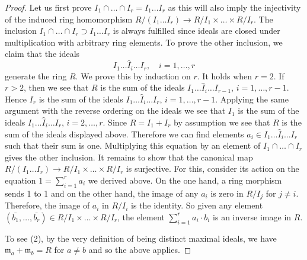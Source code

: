\documentclass[10pt,a4paper]{amsart}
\theoremstyle{plain}
\theoremstyle{definition}
\theoremstyle{remark}
\numberwithin{equation}{subsection}
\begin{document}
\begin{proof}
Let us first prove $I_1 \cap \ldots \cap I_r = I_1 \ldots I_r$
as this will also imply the injectivity of the induced ring
homomorphism $R/(I_1 \ldots I_r) \rightarrow R/I_1 \times \ldots \times R/I_r$.
The inclusion $I_1 \cap \ldots \cap I_r \supset I_1 \ldots I_r$ is always
fulfilled since ideals are closed under multiplication with arbitrary ring
elements. To prove the other inclusion, we claim that the ideals
$$
I_1 \ldots \hat I_i \ldots I_r,\quad i = 1, \ldots, r
$$
generate the ring $R$. We prove this by induction on $r$. It holds when
$r = 2$. If $r > 2$, then we see that $R$ is the sum of the ideals
$I_1 \ldots \hat I_i \ldots I_{r - 1}$, $i = 1, \ldots, r - 1$.
Hence $I_r$ is the sum of the ideals
$I_1 \ldots \hat I_i \ldots I_r$, $i = 1, \ldots, r - 1$.
Applying the same argument with the reverse ordering on the ideals
we see that $I_1$ is the sum of the ideals
$I_1 \ldots \hat I_i \ldots I_r$, $i = 2, \ldots, r$.
Since $R = I_1 + I_r$ by assumption we see that $R$ is the sum of the
ideals displayed above. Therefore we can find elements
$a_i \in I_1 \ldots \hat I_i \ldots I_r$
such that their sum is one. Multiplying this equation by an element
of $I_1 \cap \ldots \cap I_r$ gives the other inclusion.
It remains to show that the canonical map
$R/(I_1 \ldots I_r) \rightarrow R/I_1 \times \ldots \times R/I_r$
is surjective. For this, consider its action on the equation
$1 = \sum_{i=1}^r a_i$ we derived above. On the one hand, a
ring morphism sends 1 to 1 and on the other hand, the image of any
$a_i$ is zero in $R/I_j$ for $j \neq i$. Therefore, the image of $a_i$
in $R/I_i$ is the identity. So given any element
$(\bar{b_1}, \ldots, \bar{b_r}) \in R/I_1 \times \ldots \times R/I_r$,
the element $\sum_{i=1}^r a_i \cdot b_i$ is an inverse image in $R$.

\medskip\noindent
To see (2), by the very definition of being distinct maximal ideals, we have
$\mathfrak{m}_a + \mathfrak{m}_b = R$ for $a \neq b$ and so the above applies.
\end{proof}
\end{document}
